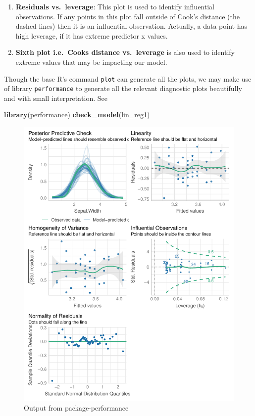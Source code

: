 \documentclass[
]{book}
\newenvironment{Shaded}{\begin{snugshade}}{\end{snugshade}}
\newcommand{\FunctionTok}[1]{\textcolor[rgb]{0.13,0.29,0.53}{\textbf{#1}}}
\newcommand{\NormalTok}[1]{#1}
\providecommand{\tightlist}{%
  \setlength{\itemsep}{0pt}\setlength{\parskip}{0pt}}
\begin{document}
\begin{enumerate}
\def\labelenumi{\arabic{enumi}.}
\setcounter{enumi}{4}
\tightlist
\item
  \textbf{Residuals vs.~leverage}: This plot is used to identify influential observations. If any points in this plot fall outside of Cook's distance (the dashed lines) then it is an influential observation. Actually, a data point has high leverage, if it has extreme predictor x values.
\item
  \textbf{Sixth plot i.e.~Cooks distance vs.~leverage} is also used to identify extreme values that may be impacting our model.
\end{enumerate}

Though the base R's command \texttt{plot} can generate all the plots, we may make use of library \texttt{performance} to generate all the relevant diagnostic plots beautifully and with small interpretation. See

\begin{Shaded}
\begin{Highlighting}[]
\FunctionTok{library}\NormalTok{(performance)}
\FunctionTok{check\_model}\NormalTok{(lin\_reg1)}
\end{Highlighting}
\end{Shaded}

\begin{figure}

{\centering \includegraphics{DauR_files/figure-latex/perf-1} 

}

\caption{Output from package-performance}\label{fig:perf}
\end{figure}
\end{document}
